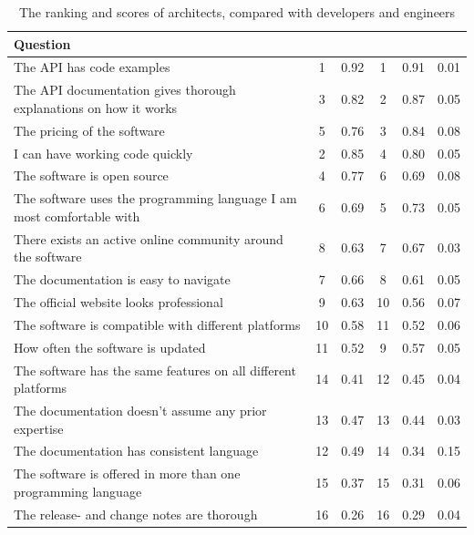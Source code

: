 \documentclass{article}
\begin{document}
\begin{table}[H]
\centering
\begin{tabularx}{\columnwidth}{X|c:c|c:c|c}

\textbf{Question}                                                    &     & &   & & \\ \hline
The API has code examples &         1 & 0.92 & 1 & 0.91 & 0.01  \\ \hline
The API documentation gives thorough explanations on how it works & 3 & 0.82 & 2 & 0.87 & 0.05  \\ \hline
The pricing of the software & 5 & 0.76 & 3 & 0.84 & 0.08  \\ \hline
I can have working code quickly & 2 & 0.85             & 4 & 0.80 & 0.05  \\ \hline
The software is open source & 4 & 0.77 & 6 & 0.69 & 0.08  \\ \hline
The software uses the programming language I am most comfortable with & 6 & 0.69             & 5 & 0.73 & 0.05  \\ \hline
There exists an active online community around the software & 8 & 0.63 & 7 & 0.67 & 0.03  \\ \hline
The documentation is easy to navigate & 7 & 0.66 &               8 & 0.61 & 0.05  \\ \hline
The official website looks professional & 9 & 0.63 & 10 & 0.56             & 0.07  \\ \hline
The software is compatible with different platforms & 10 & 0.58 & 11 & 0.52 & 0.06  \\ \hline
How often the software is updated &        11 & 0.52 & 9 & 0.57 & 0.05  \\ \hline
The software has the same features on all different platforms & 14 & 0.41 & 12 & 0.45 & 0.04  \\ \hline
The documentation doesn't assume any prior expertise                  & 13 & 0.47 & 13 & 0.44 & 0.03  \\ \hline
The documentation has consistent language & 12 & 0.49 & 14 & 0.34 & 0.15  \\ \hline
The software is offered in more than one programming language &        15 & 0.37 & 15 & 0.31 & 0.06  \\ \hline
The release- and change notes are thorough & 16 & 0.26 & 16 & 0.29 & 0.04  \\ \hline
\end{tabularx}
\caption{The ranking and scores of architects, compared with developers and engineers}
\label{tab:arch-devs}
\end{table}
\end{document}

